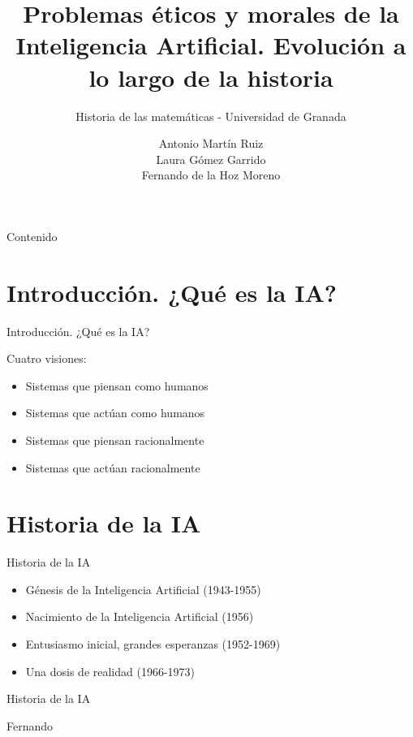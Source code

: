 \documentclass{beamer}
\title{Problemas éticos y morales de la
Inteligencia Artificial. Evolución a lo largo de la historia}
\subtitle{Historia de las matemáticas - Universidad de Granada}
\author{Antonio Martín Ruiz \\ Laura Gómez Garrido \\ Fernando de la Hoz Moreno  }
\begin{document}
\begin{frame}
\titlepage
\end{frame}
\begin{frame}{Contenido}
  \tableofcontents
\end{frame}
\section{Introducción. ¿Qué es la IA?}

\begin{frame}{Introducción. ¿Qué es la IA?}

Cuatro visiones:

\begin{itemize}
\item Sistemas que piensan como humanos
\item Sistemas que actúan como humanos
\item Sistemas que piensan racionalmente
\item Sistemas que actúan racionalmente
\end{itemize}

\end{frame}

\section{Historia de la IA}

\begin{frame}{Historia de la IA}
\begin{itemize}
\item Génesis de la Inteligencia Artificial (1943-1955)
\item Nacimiento de la Inteligencia Artificial (1956)
\item Entusiasmo inicial, grandes esperanzas (1952-1969)
\item Una dosis de realidad (1966-1973)
\end{itemize}
\end{frame}

\begin{frame}{Historia de la IA}

Fernando

\end{frame}
\end{document}
